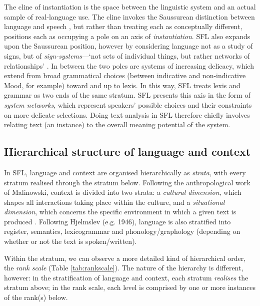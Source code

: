 The cline of instantiation is the space between the linguistic system and an actual sample of real-language use. The cline invokes the Saussurean distinction between language and speech \parencite*{saussure_course_1916}, but rather than treating each as conceptually different, positions each as occupying a pole on an axis of \emph{instantiation}. \gls{SFL} also expands upon the Saussurean position, however by considering language not as a study of signs, but of \emph{sign-systems}---`not sets of individual things, but rather networks of relationships' \cite[p.~4]{halliday_language_1989}. In between the two poles are  systems of increasing delicacy, which extend from broad grammatical choices (between indicative and non\hyp{}indicative Mood, for example) toward and up to lexis. In this way, \gls{SFL} treats lexis and grammar as two ends of the same stratum. \gls{SFL} presents this axis in the form of \emph{system networks}, which represent speakers' possible choices and their constraints on more delicate selections. Doing text analysis in \gls{SFL} therefore chiefly involves relating text (an instance) to the overall meaning potential of the system.

\subsection{Hierarchical structure of language and context}

In \gls{SFL}, language and context are organised hierarchically as \emph{strata}, with every stratum realised through the stratum below. Following the anthropological work of Malinowski, context is divided into two strata: a \emph{cultural dimension}, which shapes all interactions taking place within the culture, and a \emph{situational dimension}, which concerns the specific environment in which a given text is produced \cite[p.~6]{halliday_language_1989}. Following Hjelmslev (e.g. 1946), language is also stratified into register, semantics, \gls{lexicogrammar} and phonology\slash graphology (depending on whether or not the text is spoken\slash written).

Within the  stratum, we can observe a more detailed kind of hierarchical order, the \emph{rank scale} (Table \ref{tab:rankscale}). The nature of the hierarchy is different, however: in the stratification of language and context, each stratum \emph{realises} the stratum above; in the rank scale, each level is comprised by one or more instances of the rank(s) below. \nocite{halliday_concept_1966}

